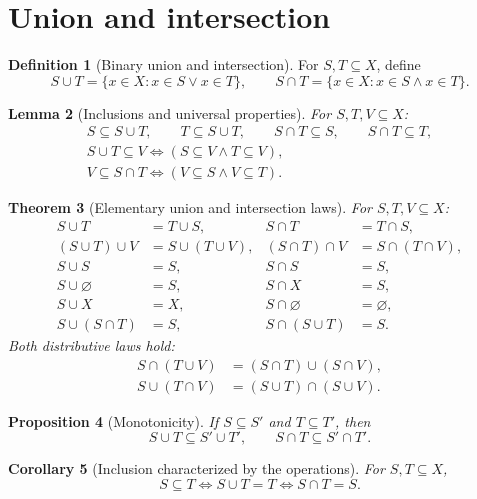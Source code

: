 \documentclass[11pt]{article}
\newtheorem{theorem}{Theorem}[section]
\newtheorem{lemma}[theorem]{Lemma}
\newtheorem{proposition}[theorem]{Proposition}
\newtheorem{corollary}[theorem]{Corollary}
\theoremstyle{definition}
\newtheorem{definition}[theorem]{Definition}
\begin{document}
\newpage
\section{Union and intersection}
\begin{definition}[Binary union and intersection]
For $S,T\subseteq X$, define
\[
S\cup T=\{x\in X:x\in S\lor x\in T\},\qquad
S\cap T=\{x\in X:x\in S\land x\in T\}.
\]
\end{definition}
\begin{lemma}[Inclusions and universal properties]
For $S,T,V\subseteq X$:
\begin{gather*}
S\subseteq S\cup T,\qquad T\subseteq S\cup T,\qquad
S\cap T\subseteq S,\qquad S\cap T\subseteq T,\\
S\cup T\subseteq V\iff(S\subseteq V\land T\subseteq V),\\
V\subseteq S\cap T\iff(V\subseteq S\land V\subseteq T).
\end{gather*}
\end{lemma}
\begin{theorem}[Elementary union and intersection laws]
For $S,T,V\subseteq X$:
\begin{align*}
S\cup T&=T\cup S,&S\cap T&=T\cap S,\\
(S\cup T)\cup V&=S\cup(T\cup V),&
(S\cap T)\cap V&=S\cap(T\cap V),\\
S\cup S&=S,&S\cap S&=S,\\
S\cup\varnothing&=S,&S\cap X&=S,\\
S\cup X&=X,&S\cap\varnothing&=\varnothing,\\
S\cup(S\cap T)&=S,&S\cap(S\cup T)&=S.
\end{align*}
Both distributive laws hold:
\begin{align*}
S\cap(T\cup V)&=(S\cap T)\cup(S\cap V),\\
S\cup(T\cap V)&=(S\cup T)\cap(S\cup V).
\end{align*}
\end{theorem}
\begin{proposition}[Monotonicity]
If $S\subseteq S'$ and $T\subseteq T'$, then
\[
S\cup T\subseteq S'\cup T',\qquad S\cap T\subseteq S'\cap T'.
\]
\end{proposition}
\begin{corollary}[Inclusion characterized by the operations]
For $S,T\subseteq X$,
\[
S\subseteq T\iff S\cup T=T\iff S\cap T=S.
\]
\end{corollary}

\newpage
\end{document}
